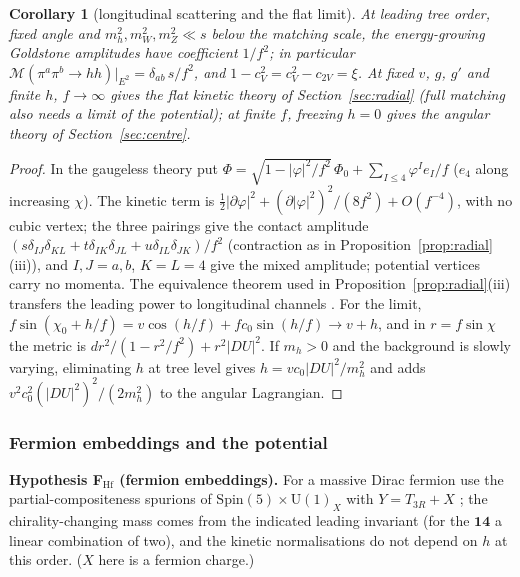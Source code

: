 \documentclass[aps,pra,onecolumn,superscriptaddress,nofootinbib,10pt]{revtex4-2}
\newtheorem{corollary}[theorem]{Corollary}
\theoremstyle{definition}
\theoremstyle{remark}
\newcommand{\U}{\mathrm{U}}
\begin{document}
\begin{corollary}[longitudinal scattering and the flat limit]\label{cor:hbscatter}
At leading tree order, fixed angle and $m_h^2,m_W^2,m_Z^2\ll s$ below the matching scale, the energy-growing
Goldstone amplitudes have coefficient $1/f^2$; in particular $\mathcal M(\pi^a\pi^b\to hh)|_{E^2}=\delta_{ab}\,s/f^2$, and
$1-c_V^2=c_V^2-c_{2V}=\xi$.  At fixed $v$, $g$, $g'$ and finite $h$, $f\to\infty$ gives the flat kinetic theory of
Section~\ref{sec:radial} (full matching also needs a limit of the potential); at finite $f$, freezing $h=0$ gives the
angular theory of Section~\ref{sec:centre}.
\end{corollary}
\begin{proof}
In the gaugeless theory put $\Phi=\sqrt{1-\lvert\varphi\rvert^2/f^2}\,\Phi_0+\sum_{I\le4}\varphi^Ie_I/f$ ($e_4$ along increasing $\chi$).  The kinetic
term is $\tfrac12\lvert\partial\varphi\rvert^2+(\partial\lvert\varphi\rvert^2)^2/(8f^2)+O(f^{-4})$, with no cubic vertex; the three pairings give the
contact amplitude $(s\delta_{IJ}\delta_{KL}+t\delta_{IK}\delta_{JL}+u\delta_{IL}\delta_{JK})/f^2$ (contraction as in Proposition~\ref{prop:radial}(iii)), and
$I,J=a,b$, $K=L=4$ give the mixed amplitude; potential vertices carry no momenta.  The equivalence theorem
used in Proposition~\ref{prop:radial}(iii) transfers the leading power to longitudinal channels \cite{CLT74,n7:SILH}.  For
the limit, $f\sin(\chi_0+h/f)=v\cos(h/f)+fc_0\sin(h/f)\to v+h$, and in $r=f\sin\chi$ the metric is $dr^2/(1-r^2/f^2)+r^2\lvert DU\rvert^2$.  If
$m_h>0$ and the background is slowly varying, eliminating $h$ at tree level gives $h=vc_0\lvert DU\rvert^2/m_h^2$ and adds
$v^2c_0^2(\lvert DU\rvert^2)^2/(2m_h^2)$ to the angular Lagrangian.
\end{proof}

\subsubsection{Fermion embeddings and the potential}

\smallskip\noindent\textbf{Hypothesis F$_{\mathrm{Hf}}$ (fermion embeddings).}\label{hyp:FHf}  For a massive Dirac fermion use the partial-compositeness
spurions of $\mathrm{Spin}(5)\times\U(1)_X$ with $Y=T_{3R}+X$ \cite{n7:ACP,n7:CPW,n7:CGG,n7:PW}; the chirality-changing mass comes from
the indicated leading invariant (for the $\mathbf{14}$ a linear combination of two), and the kinetic normalisations
do not depend on $h$ at this order.  ($X$ here is a fermion charge.)
\end{document}
